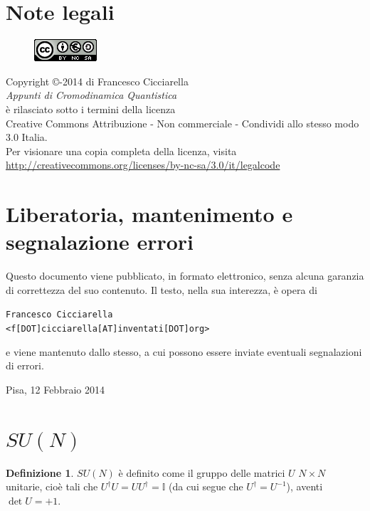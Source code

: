 \documentclass[12pt,a4paper]{article}
\theoremstyle{definition}
\newtheorem{dfn}{Definizione}[section]
\newcommand{\adj}[1]{#1^{\dagger}}
\numberwithin{equation}{section}
\begin{document}
\section*{Note legali}
\begin{center}
\begin{figure}[htbp]
\centering
\includegraphics[scale=1]{Addons/88x31.png}
\end{figure}
\vspace{0.5cm}
Copyright \copyright {}-2014 di Francesco Cicciarella \\
\textit{Appunti di Cromodinamica Quantistica} \\	
è rilasciato sotto i termini della licenza \\
Creative Commons Attribuzione - Non commerciale - Condividi allo stesso modo 3.0 Italia. \\
Per visionare una copia completa della licenza, visita \\
\url{http://creativecommons.org/licenses/by-nc-sa/3.0/it/legalcode}
\end{center}
\section*{Liberatoria, mantenimento e segnalazione errori}
Questo documento viene pubblicato, in formato elettronico, senza alcuna garanzia di correttezza del suo contenuto. Il testo, nella sua interezza, è opera di \\

\vspace{0.3cm}
\begin{flushleft}
\texttt{Francesco Cicciarella}\\
\texttt{<f[DOT]cicciarella[AT]inventati[DOT]org>}
\end{flushleft}
\vspace{0.3cm}
e viene mantenuto dallo stesso, a cui possono essere inviate eventuali segnalazioni di errori.
\vspace{1cm}
\begin{flushright}
Pisa, 12 Febbraio 2014
\end{flushright}
\pagebreak


\tableofcontents
\pagebreak
{}
\section{$SU(N)$}
\begin{dfn}
$SU(N)$ è definito come il gruppo delle matrici $U$ $N\times N$ unitarie, cioè tali che $\adj{U}U=U\adj{U}=\mathbb{I}$ (da cui segue che $\adj{U}=U^{-1}$), aventi $\det U=+1$.
\end{dfn}
\end{document}
